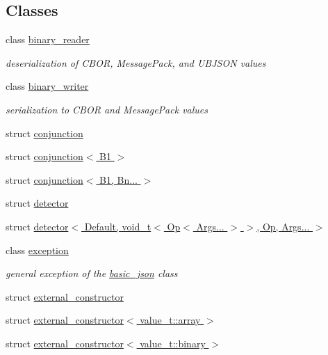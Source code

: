 \subsection*{Classes}
\begin{DoxyCompactItemize}
\item 
class \hyperlink{classnlohmann_1_1detail_1_1binary__reader}{binary\+\_\+reader}
\begin{DoxyCompactList}\small\item\em deserialization of C\+B\+OR, Message\+Pack, and U\+B\+J\+S\+ON values \end{DoxyCompactList}\item 
class \hyperlink{classnlohmann_1_1detail_1_1binary__writer}{binary\+\_\+writer}
\begin{DoxyCompactList}\small\item\em serialization to C\+B\+OR and Message\+Pack values \end{DoxyCompactList}\item 
struct \hyperlink{structnlohmann_1_1detail_1_1conjunction}{conjunction}
\item 
struct \hyperlink{structnlohmann_1_1detail_1_1conjunction_3_01B1_01_4}{conjunction$<$ B1 $>$}
\item 
struct \hyperlink{structnlohmann_1_1detail_1_1conjunction_3_01B1_00_01Bn_8_8_8_01_4}{conjunction$<$ B1, Bn... $>$}
\item 
struct \hyperlink{structnlohmann_1_1detail_1_1detector}{detector}
\item 
struct \hyperlink{structnlohmann_1_1detail_1_1detector_3_01Default_00_01void__t_3_01Op_3_01Args_8_8_8_01_4_01_4_00_01Op_00_01Args_8_8_8_01_4}{detector$<$ Default, void\+\_\+t$<$ Op$<$ Args... $>$ $>$, Op, Args... $>$}
\item 
class \hyperlink{classnlohmann_1_1detail_1_1exception}{exception}
\begin{DoxyCompactList}\small\item\em general exception of the \hyperlink{classnlohmann_1_1basic__json}{basic\+\_\+json} class \end{DoxyCompactList}\item 
struct \hyperlink{structnlohmann_1_1detail_1_1external__constructor}{external\+\_\+constructor}
\item 
struct \hyperlink{structnlohmann_1_1detail_1_1external__constructor_3_01value__t_1_1array_01_4}{external\+\_\+constructor$<$ value\+\_\+t\+::array $>$}
\item 
struct \hyperlink{structnlohmann_1_1detail_1_1external__constructor_3_01value__t_1_1binary_01_4}{external\+\_\+constructor$<$ value\+\_\+t\+::binary $>$}

\end{DoxyCompactItemize}
